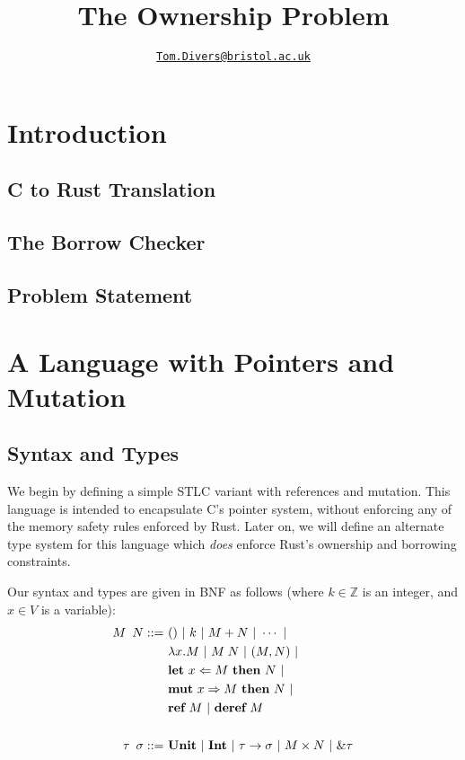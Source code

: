 \documentclass{article}
\title{The Ownership Problem}
\author{\href{mailto:oi24939@bristol.ac.uk}{\texttt{Tom.Divers@bristol.ac.uk}}}
\date{}
\newcommand{\agap}{\hspace{0.25em}}
\newcommand{\mkref}{\textbf{ref}~}
\newcommand{\deref}{\textbf{deref}~}%
\newcommand{\mutate}[3]{\textbf{mut}~ #1 \Rightarrow #2 ~\textbf{then}~ #3}
\newcommand{\letvar}[3]{\textbf{let}~ #1 \Leftarrow #2 ~\textbf{then}~ #3}
\begin{document}
\maketitle

\section{Introduction}

\subsection{C to Rust Translation}

\cite{zhang2023crown}

\subsection{The Borrow Checker}

\subsection{Problem Statement}

\section{A Language with Pointers and Mutation}

\subsection{Syntax and Types}

We begin by defining a simple STLC variant with references and mutation. This language is intended to encapsulate C's pointer system, without enforcing any of the memory safety rules enforced by Rust. Later on, we will define an alternate type system for this language which \textit{does} enforce Rust's ownership and borrowing constraints.

Our syntax and types are given in BNF as follows (where $k \in \mathbb{Z}$ is an integer, and $x \in V$ is a variable):
\begin{align*}
    M \hspace{0.5em} N ::=~ &() ~|~ k ~|~ M + N ~|~ \cdots ~|~\\ 
    &\lambda x . M ~|~ M \agap N ~|~ (M, N) ~|~\\
    &\letvar{x}{M}{N} ~|~\\ 
    &\mutate{x}{M}{N} ~|~\\
    &\mkref M ~|~ \deref M\\    
    ~\\
    \tau \hspace{0.5em} \sigma ::=~ &\textbf{Unit} ~|~ \textbf{Int} ~|~ \tau \rightarrow \sigma ~|~ M \times N ~|~ \& \tau
\end{align*}
\end{document}
